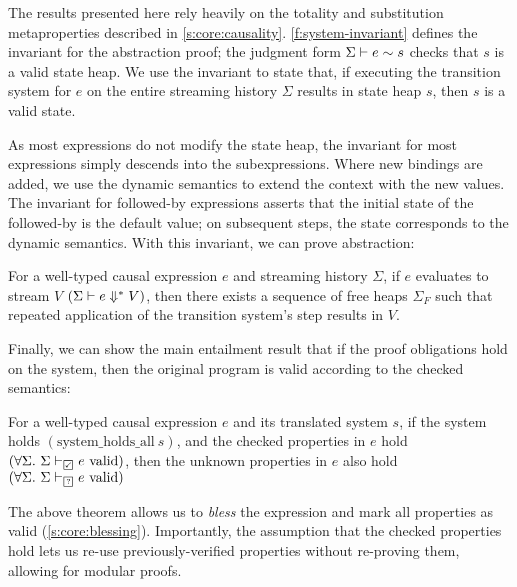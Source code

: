 

The results presented here rely heavily on the totality and substitution metaproperties described in \autoref{s:core:causality}.
\autoref{f:system-invariant} defines the invariant for the abstraction proof; the judgment form $\Sigma \vdash e \sim s$ checks that $s$ is a valid state heap.
We use the invariant to state that, if executing the transition system for $e$ on the entire streaming history $\Sigma$ results in state heap $s$, then $s$ is a valid state.

As most expressions do not modify the state heap, the invariant for most expressions simply descends into the subexpressions.
Where new bindings are added, we use the dynamic semantics to extend the context with the new values.
The invariant for followed-by expressions asserts that the initial state of the followed-by is the default value; on subsequent steps, the state corresponds to the dynamic semantics.
With this invariant, we can prove abstraction:

\begin{theorem}
  For a well-typed causal expression $e$ and streaming history $\Sigma$, if $e$ evaluates to stream $V$ $(\Sigma \vdash e \Downarrow^{*} V)$, then there exists a sequence of free heaps $\Sigma_{F}$ such that repeated application of the transition system's step results in $V$.
\end{theorem}

Finally, we can show the main entailment result that if the proof obligations hold on the system, then the original program is valid according to the checked semantics:

\begin{theorem}
  For a well-typed causal expression $e$ and its translated system $s$, if the system holds $(\text{system_holds_all}~s)$, and the checked properties in $e$ hold $(\forall \Sigma.~\semcheck{\Sigma}{\PSValid}{e})$, then
  the unknown properties in $e$ also hold $(\forall \Sigma.~\semcheck{\Sigma}{\PSUnknown}{e})$
\end{theorem}

The above theorem allows us to \emph{bless} the expression and mark all properties as valid (\autoref{s:core:blessing}).
Importantly, the assumption that the checked properties hold lets us re-use previously-verified properties without re-proving them, allowing for modular proofs.
